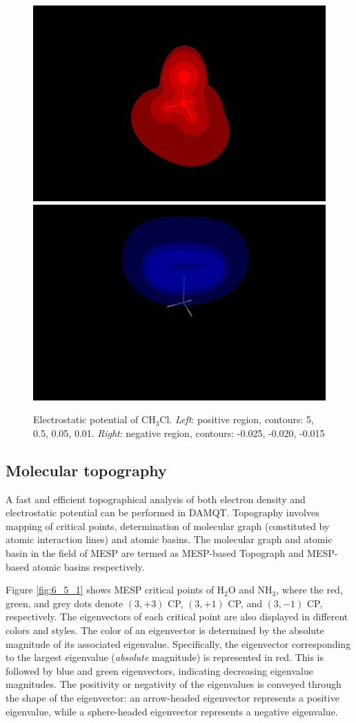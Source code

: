 \documentclass[10pt]{article}
\begin{document}
\vspace*{5mm}
\begin{figure}[H]
\begin{center}
\vspace*{-3mm}
\includegraphics[width=.4\linewidth]{CH3Cl-pot-pos-b.png}
\hspace*{5mm}
\includegraphics[width=.4\linewidth]{CH3Cl-pot-neg-b.png}
\end{center}
\caption[Electrostatic potential of CH$_3$Cl]{ Electrostatic potential of CH$_3$Cl. 
{\it Left}: positive region, contours: 5, 0.5, 0.05, 0.01. 
{\it Right}: negative region, contours: -0.025, -0.020, -0.015
\label{fig:6_4_2}}
\end{figure}


\subsection{Molecular topography \label{sec:6.5} }

A fast and efficient topographical analysis of both electron density and electrostatic potential can be 
performed in DAMQT. Topography involves mapping of critical points, determination of 
molecular graph (constituted by atomic interaction lines) and atomic basins. The 
molecular graph and atomic basin in the field of MESP are termed as 
MESP-based Topograph and MESP-based atomic basins respectively.

Figure \ref{fig:6_5_1} shows MESP critical points of H$_2$O and NH$_3$, where the red, green, and grey dots 
denote $(3,+3)$ CP, $(3,+1)$ CP, and $(3,-1)$ CP, respectively. The eigenvectors of each critical point are also
displayed in different colors and styles. The color of an eigenvector is determined by the absolute magnitude 
of its associated eigenvalue. Specifically, the eigenvector corresponding to the largest eigenvalue 
({\it absolute} magnitude) is represented in red. This is followed by blue and green eigenvectors, indicating 
decreasing eigenvalue magnitudes. The positivity or negativity of the eigenvalues is conveyed through the 
shape of the eigenvector: an arrow-headed eigenvector represents a positive eigenvalue, while a 
sphere-headed eigenvector represents a negative eigenvalue.
  
\end{document}
